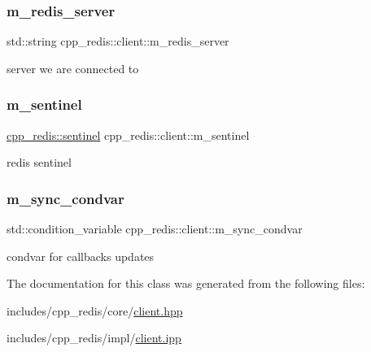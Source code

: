 \subsubsection{\texorpdfstring{m\+\_\+redis\+\_\+server}{m\_redis\_server}}
{\footnotesize\ttfamily std\+::string cpp\+\_\+redis\+::client\+::m\+\_\+redis\+\_\+server\hspace{0.3cm}{\ttfamily [private]}}

server we are connected to \mbox{\label{classcpp__redis_1_1client_a79979ccbffa192119ae2f0c03aaa6130}} 
\subsubsection{\texorpdfstring{m\+\_\+sentinel}{m\_sentinel}}
{\footnotesize\ttfamily \hyperlink{classcpp__redis_1_1sentinel}{cpp\+\_\+redis\+::sentinel} cpp\+\_\+redis\+::client\+::m\+\_\+sentinel\hspace{0.3cm}{\ttfamily [private]}}

redis sentinel \mbox{\label{classcpp__redis_1_1client_a3dcead667f0e7a23766fbd35bcf8cfc2}} 
\subsubsection{\texorpdfstring{m\+\_\+sync\+\_\+condvar}{m\_sync\_condvar}}
{\footnotesize\ttfamily std\+::condition\+\_\+variable cpp\+\_\+redis\+::client\+::m\+\_\+sync\+\_\+condvar\hspace{0.3cm}{\ttfamily [private]}}

condvar for callbacks updates 

The documentation for this class was generated from the following files\+:\begin{DoxyCompactItemize}
\item 
includes/cpp\+\_\+redis/core/\hyperlink{client_8hpp}{client.\+hpp}\item 
includes/cpp\+\_\+redis/impl/\hyperlink{client_8ipp}{client.\+ipp}\end{DoxyCompactItemize}

